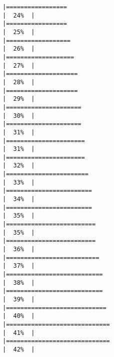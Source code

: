\documentclass[
]{article}
\begin{document}
\begin{verbatim}
|=================                                                     |  24%  |                                                                              |=================                                                     |  25%  |                                                                              |==================                                                    |  26%  |                                                                              |===================                                                   |  27%  |                                                                              |====================                                                  |  28%  |                                                                              |====================                                                  |  29%  |                                                                              |=====================                                                 |  30%  |                                                                              |=====================                                                 |  31%  |                                                                              |======================                                                |  31%  |                                                                              |======================                                                |  32%  |                                                                              |=======================                                               |  33%  |                                                                              |========================                                              |  34%  |                                                                              |========================                                              |  35%  |                                                                              |=========================                                             |  35%  |                                                                              |=========================                                             |  36%  |                                                                              |==========================                                            |  37%  |                                                                              |===========================                                           |  38%  |                                                                              |===========================                                           |  39%  |                                                                              |============================                                          |  40%  |                                                                              |=============================                                         |  41%  |                                                                              |=============================                                         |  42%  |                                                                              
\end{verbatim}
\end{document}
